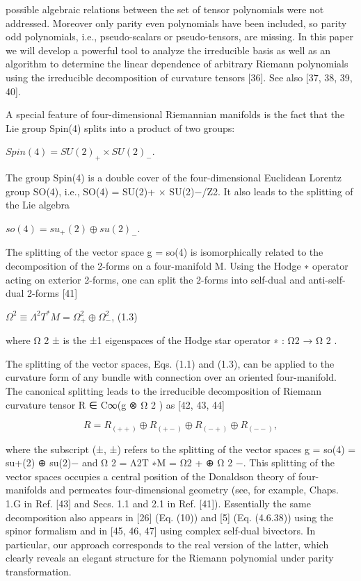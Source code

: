 \documentclass{article}
\begin{document}
possible algebraic relations between the set of tensor polynomials were not addressed. Moreover only parity even polynomials have been included, so parity odd polynomials, i.e., pseudo-scalars or pseudo-tensors, are missing. In this paper we will develop a powerful tool to analyze the irreducible basis as well as an algorithm to determine the linear dependence of arbitrary Riemann polynomials using the irreducible decomposition of curvature tensors [36]. See also [37, 38, 39, 40].

A special feature of four-dimensional Riemannian manifolds is the fact that the Lie group Spin(4) splits into a product of two groups:

$Spin(4)=SU(2)_{+}\times SU(2)_{-}$.

The group Spin(4) is a double cover of the four-dimensional Euclidean Lorentz group SO(4), i.e., SO(4) = SU(2)+ × SU(2)−/Z2. It also leads to the splitting of the Lie algebra

$so(4)=su_{+}(2)\oplus su(2)_{-}$.

The splitting of the vector space g = so(4) is isomorphically related to the decomposition of the 2-forms on a four-manifold M. Using the Hodge ∗ operator acting on exterior 2-forms, one can split the 2-forms into self-dual and anti-self-dual 2-forms [41]

$\Omega^{2}\equiv\Lambda^{2}T^{*}M=\Omega^{2}_{+}\oplus\Omega^{2}_{-}$, (1.3)

where Ω 2 ± is the ±1 eigenspaces of the Hodge star operator ∗ : Ω2 → Ω 2 .

The splitting of the vector spaces, Eqs. (1.1) and (1.3), can be applied to the curvature form of any bundle with connection over an oriented four-manifold. The canonical splitting leads to the irreducible decomposition of Riemann curvature tensor R ∈ C∞(g ⊗ Ω 2 ) as [42, 43, 44]

$$R=R_{(++)}\oplus R_{(+-)}\oplus R_{(-+)}\oplus R_{(--)},\tag{1.4}$$

where the subscript (±, ±) refers to the splitting of the vector spaces g = so(4) = su+(2) ⊕ su(2)− and Ω 2 = Λ2T ∗M = Ω2 + ⊕ Ω 2 −. This splitting of the vector spaces occupies a central position of the Donaldson theory of four-manifolds and permeates four-dimensional geometry (see, for example, Chaps. 1.G in Ref. [43] and Secs. 1.1 and 2.1 in Ref. [41]). Essentially the same decomposition also appears in [26] (Eq. (10)) and [5] (Eq. (4.6.38)) using the spinor formalism and in [45, 46, 47] using complex self-dual bivectors. In particular, our approach corresponds to the real version of the latter, which clearly reveals an elegant structure for the Riemann polynomial under parity transformation.
\end{document}
